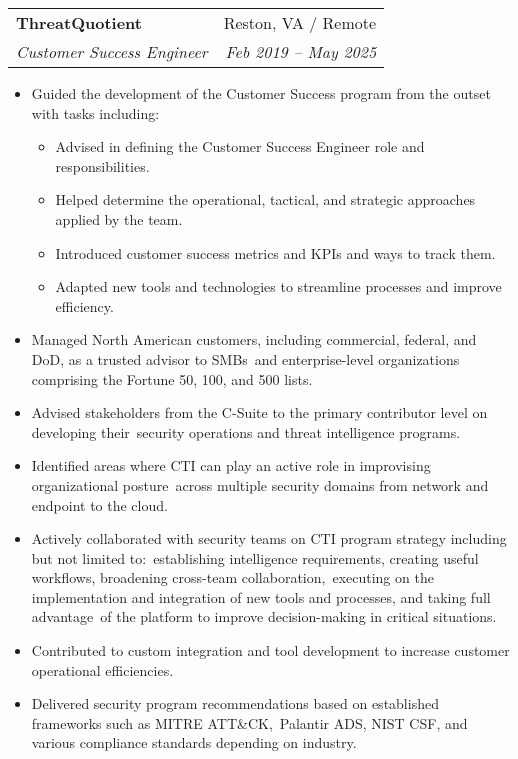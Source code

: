 \documentclass[letterpaper,11pt]{article}
\makeatletter
\newcommand{\resumeSubheading}[4]{
  \vspace{-1pt}\item
    \begin{tabular*}{0.97\textwidth}[t]{l@{\extracolsep{\fill}}r}
      \textbf{#1} & #2 \\
      \textit{\small#3} & \textit{\small #4} \\
    \end{tabular*}\vspace{-5pt}
}
\newcommand{\resumeItemListStart}{\begin{itemize}[nosep]}
\newcommand{\resumeItemListEnd}{\end{itemize}\vspace{-5pt}}
\makeatother
\begin{document}
\resumeSubheading
{ThreatQuotient}{Reston, VA / Remote}
{Customer Success Engineer}{Feb 2019 -- May 2025}
\resumeItemListStart
\item Guided the development of the Customer Success program from the outset with tasks including:
\begin{itemize}[nosep]
  \item Advised in defining the Customer Success Engineer role and responsibilities.
  \item Helped determine the operational, tactical, and strategic approaches applied by the team.
  \item Introduced customer success metrics and KPIs and ways to track them.
  \item Adapted new tools and technologies to streamline processes and improve efficiency.
\end{itemize}
\item Managed North American customers, including commercial, federal, and DoD, as a trusted advisor to SMBs\
and enterprise-level organizations comprising the Fortune 50, 100, and 500 lists.
\item Advised stakeholders from the C-Suite to the primary contributor level on developing their\
security operations and threat intelligence programs.
\item Identified areas where CTI can play an active role in improvising organizational posture\
across multiple security domains from network and endpoint to the cloud.
\item Actively collaborated with security teams on CTI program strategy including but not limited to:\
establishing intelligence requirements, creating useful workflows, broadening cross-team collaboration,\
executing on the implementation and integration of new tools and processes, and taking full advantage\
of the platform to improve decision-making in critical situations.
\item Contributed to custom integration and tool development to increase customer operational efficiencies.
\item Delivered security program recommendations based on established frameworks such as {MITRE ATT\&CK},\
Palantir ADS, NIST CSF, and various compliance standards depending on industry.
\resumeItemListEnd
\end{document}
